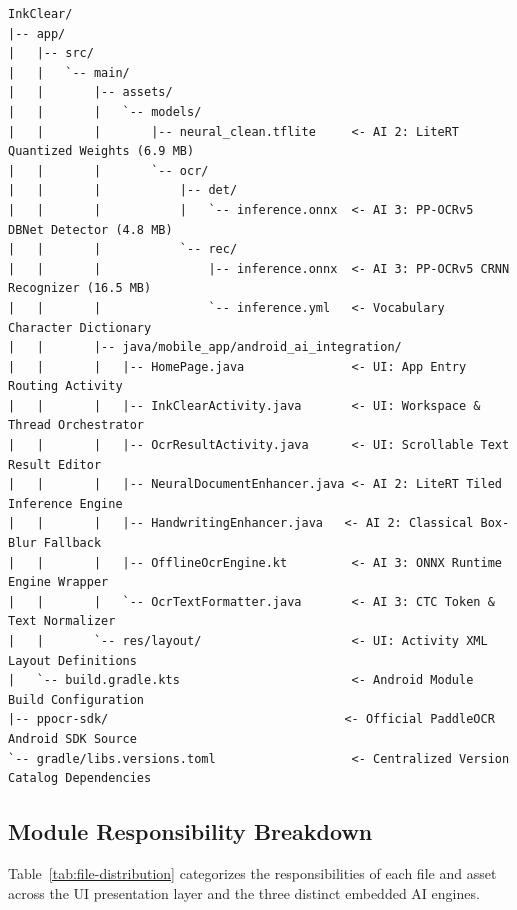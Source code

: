 \documentclass[11pt,a4paper]{article}
\begin{document}
\begin{lstlisting}[caption={InkClear project repository directory tree structure.}, label={lst:file-tree}]
InkClear/
|-- app/
|   |-- src/
|   |   `-- main/
|   |       |-- assets/
|   |       |   `-- models/
|   |       |       |-- neural_clean.tflite     <- AI 2: LiteRT Quantized Weights (6.9 MB)
|   |       |       `-- ocr/
|   |       |           |-- det/
|   |       |           |   `-- inference.onnx  <- AI 3: PP-OCRv5 DBNet Detector (4.8 MB)
|   |       |           `-- rec/
|   |       |               |-- inference.onnx  <- AI 3: PP-OCRv5 CRNN Recognizer (16.5 MB)
|   |       |               `-- inference.yml   <- Vocabulary Character Dictionary
|   |       |-- java/mobile_app/android_ai_integration/
|   |       |   |-- HomePage.java               <- UI: App Entry Routing Activity
|   |       |   |-- InkClearActivity.java       <- UI: Workspace & Thread Orchestrator
|   |       |   |-- OcrResultActivity.java      <- UI: Scrollable Text Result Editor
|   |       |   |-- NeuralDocumentEnhancer.java <- AI 2: LiteRT Tiled Inference Engine
|   |       |   |-- HandwritingEnhancer.java   <- AI 2: Classical Box-Blur Fallback
|   |       |   |-- OfflineOcrEngine.kt         <- AI 3: ONNX Runtime Engine Wrapper
|   |       |   `-- OcrTextFormatter.java       <- AI 3: CTC Token & Text Normalizer
|   |       `-- res/layout/                     <- UI: Activity XML Layout Definitions
|   `-- build.gradle.kts                        <- Android Module Build Configuration
|-- ppocr-sdk/                                 <- Official PaddleOCR Android SDK Source
`-- gradle/libs.versions.toml                   <- Centralized Version Catalog Dependencies
\end{lstlisting}

\subsection{Module Responsibility Breakdown}

Table~\ref{tab:file-distribution} categorizes the responsibilities of each file and asset across the UI presentation layer and the three distinct embedded AI engines.
\end{document}

